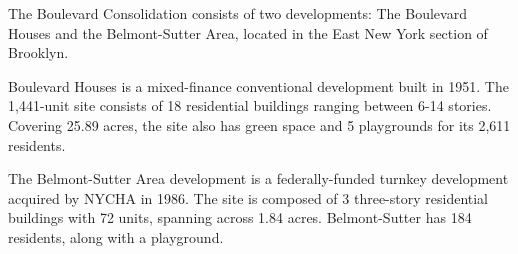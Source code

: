  

The Boulevard Consolidation consists of two developments: The Boulevard Houses and the Belmont-Sutter Area, located in the East New York section of Brooklyn. 

Boulevard Houses is a mixed-finance conventional development built in 1951. The 1,441-unit site consists of 18 residential buildings ranging between 6-14 stories. Covering 25.89 acres, the site also has green space and 5 playgrounds for its 2,611 residents. 

The Belmont-Sutter Area development is a federally-funded turnkey development acquired by NYCHA in 1986. The site is composed of 3 three-story residential buildings with 72 units, spanning across 1.84 acres. Belmont-Sutter has 184 residents, along with a playground. 